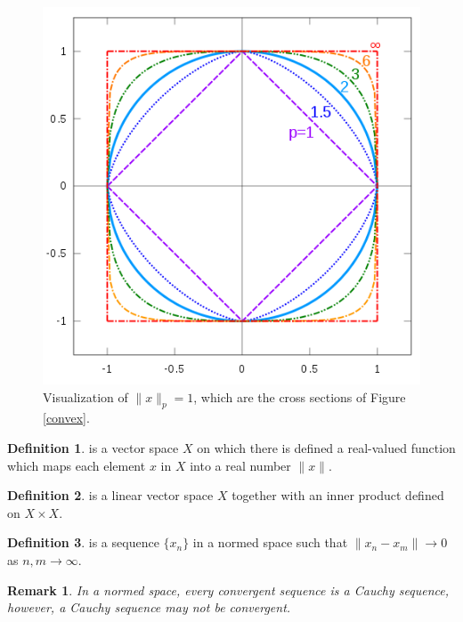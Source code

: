 \documentclass[a4paper]{article}
\theoremstyle{definition}
\newtheorem{definition}{Definition}
\theoremstyle{plain}
\newtheorem{remark}{Remark}
\begin{document}
\begin{figure}[H]
\centering
\includegraphics[scale=0.4]{figure/norm}
\caption{Visualization of $\|x\|_p=1$, which are the cross sections of Figure \ref{convex}.}
\end{figure}

\begin{definition}
 is a vector space $X$ on which there is defined a real-valued function which maps each element $x$ in $X$ into a real number $\|x\|$.
\end{definition}

\begin{definition}
 is a linear vector space $X$ together with an inner product defined on $X\times X$.
\end{definition}

\begin{definition}
 is a sequence $\{x_n\}$ in a normed space such that $\|x_n-x_m\|\rightarrow0$ as $n,m\rightarrow\infty$.
\end{definition}
\begin{remark}
In a normed space, every convergent sequence is a Cauchy sequence, however, a Cauchy sequence may not be convergent.
\end{remark}
\end{document}
